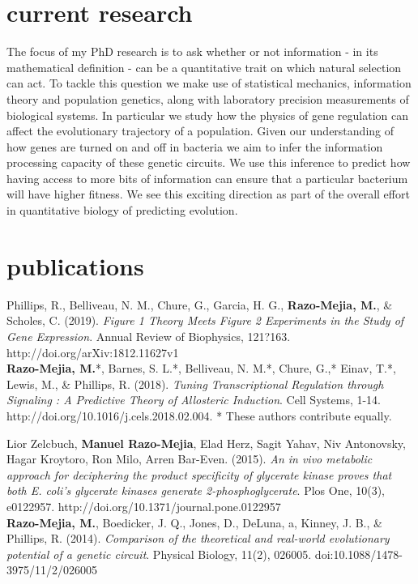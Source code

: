 \documentclass[]{friggeri-cv}
\begin{document}
\section{current research}

The focus of my PhD research is to ask whether or not information - in its mathematical definition - can be a quantitative trait on which natural selection can act. To tackle this question we make use of statistical mechanics, information theory and population genetics, along with laboratory precision measurements of biological systems. In particular we study how the physics of gene regulation can affect the evolutionary trajectory of a population. Given our understanding of how genes are turned on and off in bacteria we aim to infer the information processing capacity of these genetic circuits. We use this inference to predict how having access to more bits of information can ensure that a particular bacterium will have higher fitness. We see this exciting direction as part of the overall effort in quantitative biology of predicting evolution.

\section{publications}

Phillips, R., Belliveau, N. M., Chure, G., Garcia, H. G., \textbf{Razo-Mejia, M.}, \& Scholes, C. (2019). \textit{Figure 1 Theory Meets Figure 2 Experiments in the Study of Gene Expression}. Annual Review of Biophysics, 121?163. http://doi.org/arXiv:1812.11627v1\\

\textbf{Razo-Mejia, M.}*, Barnes, S. L.*, Belliveau, N. M.*, Chure, G.,* Einav, T.*, Lewis, M., \& Phillips, R. (2018). \textit{Tuning Transcriptional Regulation through Signaling : A Predictive Theory of Allosteric Induction}. Cell Systems, 1-14. http://doi.org/10.1016/j.cels.2018.02.004. * These authors contribute equally.

Lior Zelcbuch, \textbf{Manuel Razo-Mejia}, Elad Herz, Sagit Yahav, Niv Antonovsky, Hagar Kroytoro, Ron Milo, Arren Bar-Even. (2015). \textit{An in vivo metabolic approach for deciphering the product specificity of glycerate kinase proves that both E. coli's glycerate kinases generate 2-phosphoglycerate}. Plos One, 10(3), e0122957. http://doi.org/10.1371/journal.pone.0122957\\

\textbf{Razo-Mejia, M.}, Boedicker, J. Q., Jones, D., DeLuna, a, Kinney, J. B., \& Phillips, R. (2014). \textit{Comparison of the theoretical and real-world evolutionary potential of a genetic circuit}. Physical Biology, 11(2), 026005. doi:10.1088/1478-3975/11/2/026005\\
\end{document}
